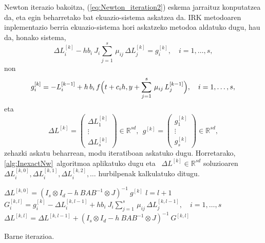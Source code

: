 
Newton iterazio bakoitza, (\ref{eq:Newton_iteration2}) eskema jarraituz konputatzea da, eta egin beharretako bat ekuazio-sistema askatzea da. IRK metodoaren inplementazio berria ekuazio-sistema hori askatzeko metodoa aldatuko dugu, hau da, honako sistema,
\begin{equation}
\label{eq:linsysZ}
 \Delta L_{i}^{[k]}  - h b_i \ J_i \sum_{j=1}^{s}\, \mu_{ij} \, \Delta L_{j}^{[k]} = g_i^{[k]}, \quad  i=1 ,\ldots, s, 
\end{equation}
non
\begin{equation}
\label{eq:gk}
g_i^{[k]} = -L_{i}^{[k-1]}  + h \, b_i\, f\Big(t+c_i h,  y+\sum_{j=1}^{s}\, \mu_{ij}\, L_{j}^{[k-1]}\Big), \quad  i=1 ,\ldots, s, \\
\end{equation}
eta
\begin{equation*}
\Delta L^{[k]}= \left(
\begin{matrix}
\Delta L_1^{[k]}\\
\vdots\\
\Delta L_s^{[k]}
\end{matrix}
\right) \in \mathbb{R}^{sd}, \ \
g^{[k]}= \left(
\begin{matrix}
g_1^{[k]} \\
\vdots\\
g_s^{[k]}
\end{matrix}
\right) \in \mathbb{R}^{sd},
\end{equation*}
%
zehazki askatu beharrean, modu iteratiboan askatuko dugu. Horretarako,  \ref{alg:InexactNw}~algoritmoa aplikatuko dugu eta ~$\Delta L^{[k]} \in \mathbb{R}^{sd}$ soluzioaren  $ \Delta L_{i}^{[k,0]},  \Delta L_{i}^{[k,1]},  \Delta L_{i}^{[k,2]}, \ldots$ hurbilpenak kalkulatuko ditugu. 

\begin{algorithm}[H]
  $ \Delta L^{[k,0]} = (I_s \otimes I_d - h \ BAB^{-1} \otimes J)^{-1} \ g^{[k]}$\;
  \BlankLine
  {
   \BlankLine
   $l=l+1$\;
   $G_i^{[k,l]} = g_i^{[k]} - \Delta L_{i}^{[k,l-1]}  + h b_i \ J_i \sum_{j=1}^{s}\, \mu_{ij} \, \Delta L_{j}^{[k,l-1]},  \quad  i=1 ,\ldots, s$\;
   \BlankLine
   $\Delta L^{[k,l]}=\Delta L^{[k,l-1]}+ (I_s \otimes I_d - h \ BAB^{-1} \otimes J)^{-1} \ G^{[k,l]}$\;
  }
 \caption{Barne iterazioa.}
 \label{alg:InexactNw}
\end{algorithm}

